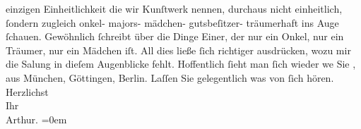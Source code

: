 \begin{ledgroupsized}[t]{13cm}
               einzigen Einheitlichkeit die wir Kunſtwerk nennen, durchaus nicht einheitlich,
               ſondern zugleich onkel- majors- mädchen- gutsbeſitzer- träumerhaft ins Auge ſchauen.
               Gewöhnlich ſchreibt über die Dinge Einer, der nur ein Onkel, {\pb}nur ein Träumer, nur ein Mädchen iſt. All dies ließe ſich
               richtiger ausdrücken, wozu mir die Sa{\geminationm}lung in dieſem
               Augenblicke fehlt.\pend
           \pstart
           Hoffentlich ſieht man ſich wieder we{\geminationn} Sie \label{K_L01638-2v}\label{K_L01638-2h}, aus München, Göttingen, Berlin. Laſſen Sie
               gelegentlich was von ſich hören.\pend
           \pstart
           Herzlichst{\\[\baselineskip]}Ihr{\\[\baselineskip]}\spacefill\mbox{Arthur.}\pend
           \leftskip=0em{}
         
         \endnumbering{}\end{ledgroupsized}  \newcommand{\dateiname}{L01638}\newcommand{\titel}{Arthur Schnitzler an Hugo von Hofmannsthal, 27. 11. 1906}\newcommand{\editorInnen}{Martin Anton Müller und Gerd-Hermann Susen}
      
